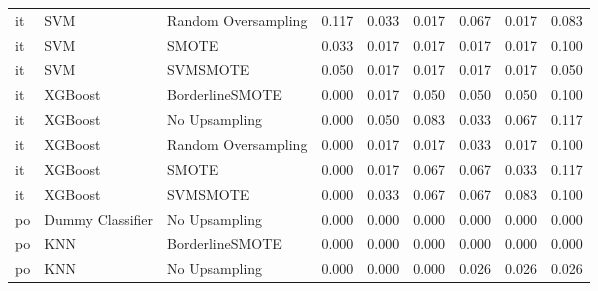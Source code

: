 \begin{tabular}{lllllllll}
      it &                          SVM & Random Oversampling & 0.117 &                     0.033 &                 0.017 &                  0.067 &                                   0.017 &     0.083 \\
      it &                          SVM &               SMOTE & 0.033 &                     0.017 &                 0.017 &                  0.017 &                                   0.017 &     0.100 \\
      it &                          SVM &            SVMSMOTE & 0.050 &                     0.017 &                 0.017 &                  0.017 &                                   0.017 &     0.050 \\
      it &                      XGBoost &     BorderlineSMOTE & 0.000 &                     0.017 &                 0.050 &                  0.050 &                                   0.050 &     0.100 \\
      it &                      XGBoost &       No Upsampling & 0.000 &                     0.050 &                 0.083 &                  0.033 &                                   0.067 &     0.117 \\
      it &                      XGBoost & Random Oversampling & 0.000 &                     0.017 &                 0.017 &                  0.033 &                                   0.017 &     0.100 \\
      it &                      XGBoost &               SMOTE & 0.000 &                     0.017 &                 0.067 &                  0.067 &                                   0.033 &     0.117 \\
      it &                      XGBoost &            SVMSMOTE & 0.000 &                     0.033 &                 0.067 &                  0.067 &                                   0.083 &     0.100 \\
      po &             Dummy Classifier &       No Upsampling & 0.000 &                     0.000 &                 0.000 &                  0.000 &                                   0.000 &     0.000 \\
      po &                          KNN &     BorderlineSMOTE & 0.000 &                     0.000 &                 0.000 &                  0.000 &                                   0.000 &     0.000 \\
      po &                          KNN &       No Upsampling & 0.000 &                     0.000 &                 0.000 &                  0.026 &                                   0.026 &     0.026 \\

\end{tabular}
